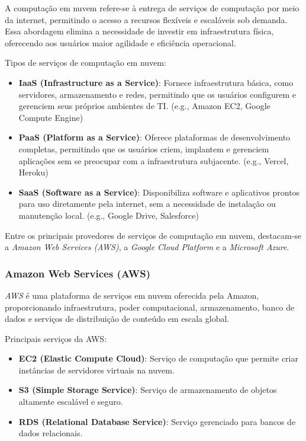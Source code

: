 
A computação em nuvem refere-se à entrega de serviços de computação por meio da internet, permitindo o acesso a recursos flexíveis e escaláveis sob demanda. Essa abordagem elimina a necessidade de investir em infraestrutura física, oferecendo aos usuários maior agilidade e eficiência operacional.

Tipos de serviços de computação em nuvem:

\begin{itemize}
    \item \textbf{IaaS (Infrastructure as a Service)}: Fornece infraestrutura básica, como servidores, armazenamento e redes, permitindo que os usuários configurem e gerenciem seus próprios ambientes de TI. (e.g., Amazon EC2, Google Compute Engine)
    \item \textbf{PaaS (Platform as a Service)}: Oferece plataformas de desenvolvimento completas, permitindo que os usuários criem, implantem e gerenciem aplicações sem se preocupar com a infraestrutura subjacente. (e.g., Vercel, Heroku)
    \item \textbf{SaaS (Software as a Service)}: Disponibiliza software e aplicativos prontos para uso diretamente pela internet, sem a necessidade de instalação ou manutenção local. (e.g., Google Drive, Salesforce)
\end{itemize}

Entre os principais provedores de serviços de computação em nuvem, destacam-se a \emph{Amazon Web Services (AWS)}, a \emph{Google Cloud Platform} e a \emph{Microsoft Azure}.

\subsubsection{Amazon Web Services (AWS)}

\emph{AWS} é uma plataforma de serviços em nuvem oferecida pela Amazon, proporcionando infraestrutura, poder computacional, armazenamento, banco de dados e serviços de distribuição de conteúdo em escala global.

Principais serviços da AWS:

\begin{itemize}
    \item \textbf{EC2 (Elastic Compute Cloud)}: Serviço de computação que permite criar instâncias de servidores virtuais na nuvem.
    \item \textbf{S3 (Simple Storage Service)}: Serviço de armazenamento de objetos altamente escalável e seguro.
    \item \textbf{RDS (Relational Database Service)}: Serviço gerenciado para bancos de dados relacionais.
\end{itemize}

